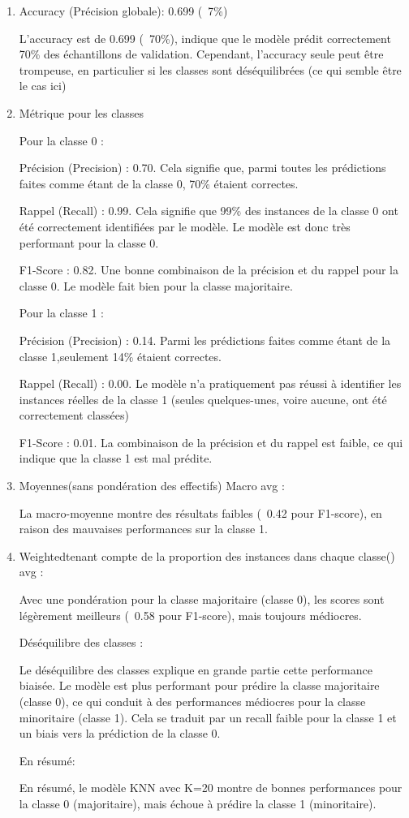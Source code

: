 \begin{enumerate}

\item Accuracy (Précision globale): 0.699 (~7\%)

L'accuracy est de 0.699 (~70\%), indique que le modèle prédit correctement 70\% des échantillons de validation. Cependant, l'accuracy seule peut être trompeuse, en particulier si les classes sont déséquilibrées (ce qui semble être le cas ici)

\item Métrique pour les classes

Pour la classe 0 :

Précision (Precision) : 0.70. Cela signifie que, parmi toutes les prédictions faites comme étant de la classe 0, 70\% étaient correctes.

Rappel (Recall) : 0.99. Cela signifie que 99\% des instances de la classe 0 ont été correctement identifiées par le modèle. Le modèle est donc très performant pour la classe 0.

F1-Score : 0.82. Une bonne combinaison de la précision et du rappel pour la classe 0. Le modèle fait bien pour la classe majoritaire.

Pour la classe 1 :

Précision (Precision) : 0.14. Parmi les prédictions faites comme étant de la classe 1,seulement 14\% étaient correctes.

Rappel (Recall) : 0.00. Le modèle n'a pratiquement pas réussi à identifier les instances réelles de la classe 1 (seules quelques-unes, voire aucune, ont été correctement classées)

F1-Score : 0.01. La combinaison de la précision et du rappel est faible, ce qui indique que la classe 1 est mal prédite.

\item Moyennes(sans pondération des effectifs) Macro avg :

La macro-moyenne montre des résultats faibles (~0.42 pour F1-score), en raison des mauvaises performances sur la classe 1.

\item Weightedtenant compte de la proportion des instances dans chaque classe() avg :

Avec une pondération pour la classe majoritaire (classe 0), les scores sont légèrement meilleurs (~0.58 pour F1-score), mais toujours médiocres.

Déséquilibre des classes :

Le déséquilibre des classes explique en grande partie cette performance biaisée. Le modèle est plus performant pour prédire la classe majoritaire (classe 0), ce qui conduit à des performances médiocres pour la classe minoritaire (classe 1). Cela se traduit par un recall faible pour la classe 1 et un biais vers la prédiction de la classe 0.

En résumé:

En résumé, le modèle KNN avec K=20 montre de bonnes performances pour la classe 0 (majoritaire), mais échoue à prédire la classe 1 (minoritaire).
\end{enumerate}

